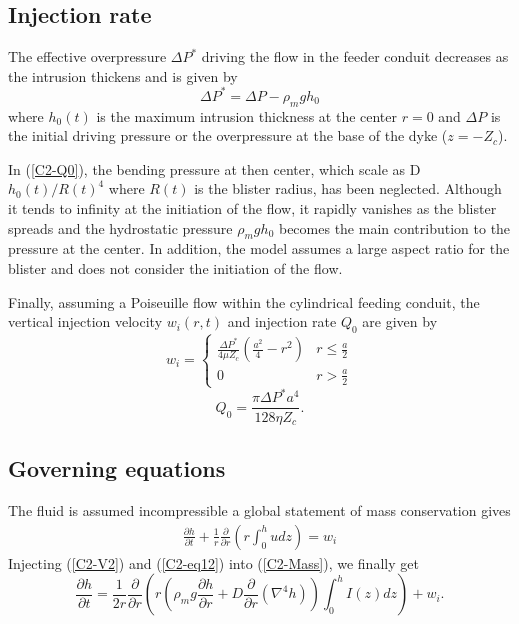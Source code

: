 \subsection{Injection rate}

The effective overpressure $\Delta P^*$ driving the flow in the feeder
conduit decreases as the intrusion thickens and is given by
\begin{equation}
  \Delta P^* = \Delta P -\rho_m g h_0 \label{C2-Q0}
\end{equation}
where $h_0(t)$ is the maximum  intrusion thickness at the center $r=0$
and $\Delta P$ is the initial  driving pressure or the overpressure at
the base of the dyke ($z = -Z_c$).

In (\ref{C2-Q0}), the bending pressure  at then center, which scale as
D$h_0(t)/R(t)^4$  where  $R(t)$  is   the  blister  radius,  has  been
neglected.  Although  it tends  to infinity at  the initiation  of the
flow, it rapidly  vanishes as the blister spreads  and the hydrostatic
pressure $\rho_m g h_0$ becomes  the main contribution to the pressure
at the  center.  In addition, the  model assumes a large  aspect ratio
for the blister and does not consider the initiation of the flow.

Finally,  assuming a  Poiseuille flow  within the  cylindrical feeding
conduit, the  vertical injection velocity $w_i(r,t)$  and injection rate
$Q_0$ are given by
\begin{equation}
  w_i=
  \begin{cases}
    \frac{ \Delta P^*}{4 \mu Z_{c}} (\frac{a^{2}}{4}-r^{2})& r \le \frac{a}{2}\\
    0 & r > \frac{a}{2}
  \end{cases}
  \label{C2-eq12}
\end{equation}
\begin{equation}
  Q_{0}=\frac{\pi \Delta P^* a^{4}}{128 \eta Z_c}.
  \label{C2-eq11}
\end{equation}


\subsection{Governing equations}
\label{chap2-sec:governing-equations}

The  fluid  is  assumed  incompressible a  global  statement  of  mass
conservation gives
\begin{eqnarray}
  \frac{\partial         h}{\partial        t} +\frac{1}{r}
                                                     \frac{\partial}{\partial
  r} \left( r\int_0^hudz\right) = w_i
           \label{C2-Mass}
\end{eqnarray}
Injecting (\ref{C2-V2})  and (\ref{C2-eq12}) into  (\ref{C2-Mass}), we
finally get
\begin{equation}
  \frac{\partial h}{\partial t} = \frac{1}{2r}
  \frac{\partial}{\partial r} \left( r\left(\rho_m g \frac{\partial h}{\partial      r}+D\frac{\partial}{\partial      r}\left(\nabla^4h\right)\right)\int_0^hI(z)dz\right)
  + w_i.
  \label{C2-EqConservation}
\end{equation}

